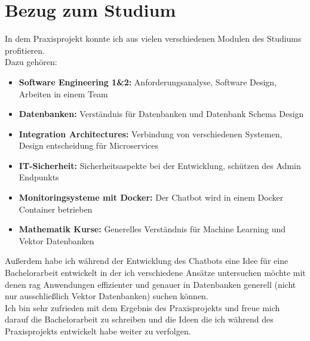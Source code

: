 \chapter{Bezug zum Studium}\label{ch:bezug_studium}
In dem Praxisprojekt konnte ich aus vielen verschiedenen Modulen des Studiums profitieren.\\
Dazu gehören:
\begin{itemize}
    \item \textbf{Software Engineering 1\&2:} Anforderungsanalyse, Software Design, Arbeiten in einem Team
    \item \textbf{Datenbanken:} Verständnis für Datenbanken und Datenbank Schema Design
    \item \textbf{Integration Architectures:} Verbindung von verschiedenen Systemen, Design entscheidung für Microservices
    \item \textbf{IT-Sicherheit:} Sicherheitsaspekte bei der Entwicklung, schützen des Admin Endpunkts
    \item \textbf{Monitoringsysteme mit Docker:} Der Chatbot wird in einem Docker Container betrieben
    \item \textbf{Mathematik Kurse:} Generelles Verständnis für Machine Learning und Vektor Datenbanken
\end{itemize}

Außerdem habe ich während der Entwicklung des Chatbots eine Idee für eine Bachelorarbeit entwickelt in der ich
verschiedene Ansätze untersuchen möchte mit denen \gls{rag} Anwendungen effizienter und genauer in Datenbanken generell (nicht nur ausschließlich Vektor Datenbanken) suchen können.\\

Ich bin sehr zufrieden mit dem Ergebnis des Praxisprojekts und freue mich darauf die Bachelorarbeit zu schreiben und die Ideen die ich während des Praxisprojekts entwickelt habe weiter zu verfolgen.
